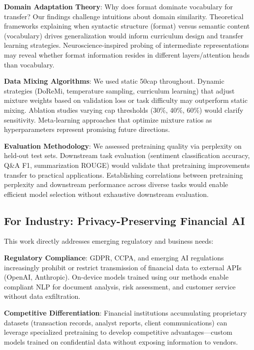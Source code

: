 \textbf{Domain Adaptation Theory}: Why does format dominate vocabulary for transfer? Our findings challenge intuitions about domain similarity. Theoretical frameworks explaining when syntactic structure (format) versus semantic content (vocabulary) drives generalization would inform curriculum design and transfer learning strategies. Neuroscience-inspired probing of intermediate representations may reveal whether format information resides in different layers/attention heads than vocabulary.

\textbf{Data Mixing Algorithms}: We used static 50cap throughout. Dynamic strategies (DoReMi, temperature sampling, curriculum learning) that adjust mixture weights based on validation loss or task difficulty may outperform static mixing. Ablation studies varying cap thresholds (30\%, 40\%, 60\%) would clarify sensitivity. Meta-learning approaches that optimize mixture ratios as hyperparameters represent promising future directions.

\textbf{Evaluation Methodology}: We assessed pretraining quality via perplexity on held-out test sets. Downstream task evaluation (sentiment classification accuracy, Q\&A F1, summarization ROUGE) would validate that pretraining improvements transfer to practical applications. Establishing correlations between pretraining perplexity and downstream performance across diverse tasks would enable efficient model selection without exhaustive downstream evaluation.

\subsection{For Industry: Privacy-Preserving Financial AI}

This work directly addresses emerging regulatory and business needs:

\textbf{Regulatory Compliance}: GDPR, CCPA, and emerging AI regulations increasingly prohibit or restrict transmission of financial data to external APIs (OpenAI, Anthropic). On-device models trained using our methods enable compliant NLP for document analysis, risk assessment, and customer service without data exfiltration.

\textbf{Competitive Differentiation}: Financial institutions accumulating proprietary datasets (transaction records, analyst reports, client communications) can leverage specialized pretraining to develop competitive advantages—custom models trained on confidential data without exposing information to vendors.

